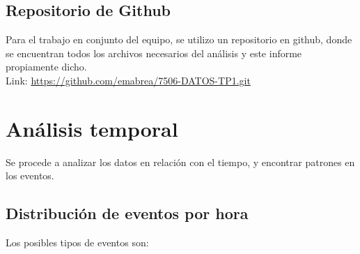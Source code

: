 \documentclass[a4paper ,12pt]{article}
\begin{document}
\subsection{Repositorio de Github}

Para el trabajo en conjunto del equipo, se utilizo un repositorio en github, donde se encuentran todos los archivos necesarios del análisis y este informe propiamente dicho.\\

Link: \url{https://github.com/emabrea/7506-DATOS-TP1.git}

\newpage





\section{Análisis temporal}

Se procede a analizar los datos en relación con el tiempo, y encontrar patrones en los eventos.

\subsection{Distribución de eventos por hora}

Los posibles tipos de eventos son:
\end{document}
